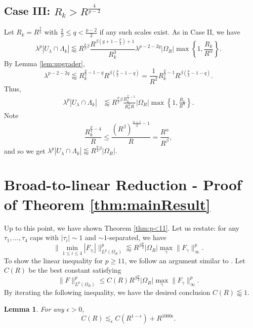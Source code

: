 \documentclass[12pt]{amsart}
\newtheorem{lemma}[theorem]{Lemma}
\begin{document}
\subsection{Case III: $R_k> R^{\frac{4}{p-2}}$} Let $R_k= R^{\frac{2}{q}}$ with $\frac{2}{\beta}\le q< \frac{p-2}{2}$ if any such scales exist. As in Case II, we have $$\lambda^p|U_\lambda\cap \Lambda_k|\lessapprox R^{\frac{p}{2}\beta}\frac{R^{\beta(q+1-\frac{p}{2})+1}}{R_k^3}\lambda^{p-2-2q}|\Omega_R|\max\left\{1, \frac{R_k}{R^\alpha}\right\}.$$ By Lemma \ref{lem:upgrader}, $$\lambda^{p-2-2q} \lessapprox R_k^{\frac{p}{2}-1-q}R^{\beta\left(\frac{p}{2}-1-q\right)}=\frac{1}{R^2}R_k^{\frac{p}{2}-1}R^{\beta\left(\frac{p}{2}-1-q\right)}.$$ Thus, \begin{align*}
    \lambda^p|U_\lambda\cap \Lambda_k|&\lessapprox R^{\frac{p}{2}\beta}\frac{R_k^{\frac{p}{2}-1}}{R_k^3R}|\Omega_R|\max\left\{1, \frac{R_k}{R^\alpha}\right\}.
\end{align*} Note $$\frac{R_k^{\frac{p}{2}-4}}{R}\le \frac{(R^\beta)^{\frac{\alpha+1}{\beta}-1}}{R}= \frac{R^\alpha}{R^\beta},$$ and so we get $\lambda^p|U_\lambda\cap \Lambda_k|\lessapprox R^{\frac{p}{2}\beta}|\Omega_R|.$ 


\section{Broad-to-linear Reduction - Proof of Theorem \ref{thm:mainResult}}\label{sec:multRed}
Up to this point, we have shown Theorem \ref{thm:p<11}. Let us restate: for any $\tau_1, \ldots, \tau_4$ caps with $|\tau_i|\sim 1$ and $\sim 1$-separated, we have \begin{equation}\label{eq: MultMainResult}
    \|\min_{1\le i\le 4}|F_{\tau_i}|\|_{L^{p}(\Omega_R)}^{p}\lessapprox R^{\beta \frac{p}{2}} |\Omega_R|\max_{\gamma}\|F_\gamma\|_\infty^{p}.
\end{equation}
  To show the linear inequality for $p\ge 11$, we follow an argument similar to \cite[Section 2]{maldague2024smallcapdecouplingmoment}. Let $C(R)$ be the best constant satisfying $$\|F\|_{L^{p}(\Omega_R)}^{p}\le C(R)R^{\beta \frac{p}{2}}|\Omega_R|\max_{\gamma}\|F_\gamma\|_{\infty}^{p}.$$ By iterating the following inequality, we have the desired conclusion $C(R)\lessapprox 1$.

\begin{lemma}\label{lem:BNinduction}
    For any $\epsilon>0$, $$C(R)\lesssim_\epsilon C(R^{1-\epsilon})+R^{1000\epsilon}.$$
\end{lemma}
\end{document}
